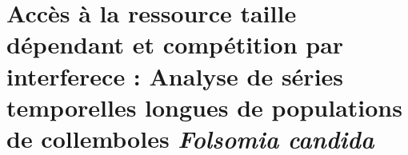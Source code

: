 \chapter[SP]{Accès à la ressource taille dépendant et compétition par interferece : Analyse de séries temporelles longues de populations de collemboles \textit{Folsomia candida}}

